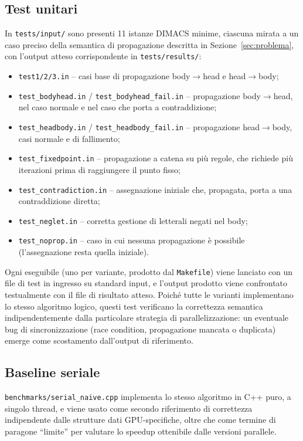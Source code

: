 \documentclass[11pt,a4paper]{article}
\begin{document}
\subsection{Test unitari}

In \texttt{tests/input/} sono presenti 11 istanze DIMACS minime, ciascuna mirata a un caso preciso
della semantica di propagazione descritta in Sezione~\ref{sec:problema}, con l'output atteso
corrispondente in \texttt{tests/results/}:

\begin{itemize}
\item \texttt{test1/2/3.in} -- casi base di propagazione body$\to$head e head$\to$body;
\item \texttt{test\_bodyhead.in} / \texttt{test\_bodyhead\_fail.in} -- propagazione body$\to$head, nel caso normale e nel caso che porta a contraddizione;
\item \texttt{test\_headbody.in} / \texttt{test\_headbody\_fail.in} -- propagazione head$\to$body, casi normale e di fallimento;
\item \texttt{test\_fixedpoint.in} -- propagazione a catena su più regole, che richiede più iterazioni prima di raggiungere il punto fisso;
\item \texttt{test\_contradiction.in} -- assegnazione iniziale che, propagata, porta a una contraddizione diretta;
\item \texttt{test\_neglet.in} -- corretta gestione di letterali negati nel body;
\item \texttt{test\_noprop.in} -- caso in cui nessuna propagazione è possibile (l'assegnazione resta quella iniziale).
\end{itemize}

Ogni eseguibile (uno per variante, prodotto dal \texttt{Makefile}) viene lanciato con un file di
test in ingresso su standard input, e l'output prodotto viene confrontato testualmente con il file
di risultato atteso. Poiché tutte le varianti implementano lo stesso algoritmo logico, questi test
verificano la correttezza semantica indipendentemente dalla particolare strategia di
parallelizzazione: un eventuale bug di sincronizzazione (race condition, propagazione mancata o
duplicata) emerge come scostamento dall'output di riferimento.

\subsection{Baseline seriale}

\texttt{benchmarks/serial\_naive.cpp} implementa lo stesso algoritmo in C++ puro, a singolo thread,
e viene usato come secondo riferimento di correttezza indipendente dalle strutture dati GPU-specifiche,
oltre che come termine di paragone ``limite'' per valutare lo speedup ottenibile dalle versioni
parallele.
\end{document}
